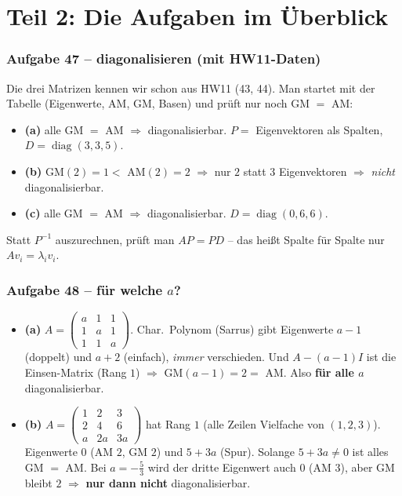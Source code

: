 \documentclass[a4paper,12pt]{article}
\begin{document}
\newpage

\part*{Teil 2: Die Aufgaben im \"Uberblick}

\section*{Aufgabe 47 -- diagonalisieren (mit HW11-Daten)}

Die drei Matrizen kennen wir schon aus HW11 (43, 44). Man startet mit der Tabelle (Eigenwerte, AM, GM, Basen) und pr\"uft nur noch GM $=$ AM:
\begin{itemize}[leftmargin=*, nosep]
    \item \textbf{(a)} alle GM $=$ AM $\Rightarrow$ diagonalisierbar. $P =$ Eigenvektoren als Spalten, $D = \operatorname{diag}(3,3,5)$.
    \item \textbf{(b)} GM$(2) = 1 <$ AM$(2) = 2$ $\Rightarrow$ nur $2$ statt $3$ Eigenvektoren $\Rightarrow$ \emph{nicht} diagonalisierbar.
    \item \textbf{(c)} alle GM $=$ AM $\Rightarrow$ diagonalisierbar. $D = \operatorname{diag}(0,6,6)$.
\end{itemize}
Statt $P^{-1}$ auszurechnen, pr\"uft man $AP = PD$ -- das hei\ss t Spalte f\"ur Spalte nur $A v_i = \lambda_i v_i$.

\section*{Aufgabe 48 -- f\"ur welche $a$?}

\begin{itemize}[leftmargin=*, nosep]
    \item \textbf{(a)} $A = \left(\begin{smallmatrix} a&1&1\\1&a&1\\1&1&a \end{smallmatrix}\right)$. Char.\ Polynom (Sarrus) gibt Eigenwerte $a-1$ (doppelt) und $a+2$ (einfach), \emph{immer} verschieden. Und $A - (a-1)I$ ist die Einsen-Matrix (Rang $1$) $\Rightarrow$ GM$(a-1) = 2 =$ AM. Also \textbf{f\"ur alle $a$} diagonalisierbar.
    \item \textbf{(b)} $A = \left(\begin{smallmatrix} 1&2&3\\2&4&6\\a&2a&3a \end{smallmatrix}\right)$ hat Rang $1$ (alle Zeilen Vielfache von $(1,2,3)$). Eigenwerte $0$ (AM $2$, GM $2$) und $5+3a$ (Spur). Solange $5+3a \neq 0$ ist alles GM $=$ AM. Bei $a = -\tfrac{5}{3}$ wird der dritte Eigenwert auch $0$ (AM $3$), aber GM bleibt $2$ $\Rightarrow$ \textbf{nur dann nicht} diagonalisierbar.
\end{itemize}
\end{document}

